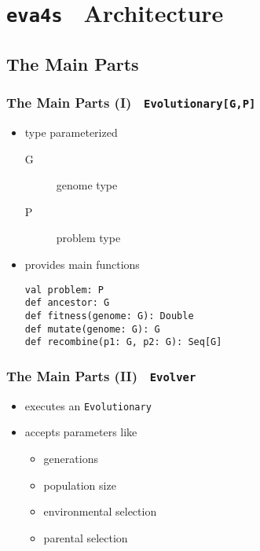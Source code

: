 \documentclass[compress,xcolor=table]{beamer}
\begin{document}
\section{\texttt{eva4s} \textendash\ Architecture}

\subsection{The Main Parts}

\begin{frame}
  \frametitle{The Main Parts (I) \textendash\ \texttt{Evolutionary[G,P]}}
  \begin{itemize}
    \item type parameterized
      \begin{description}
        \item[G] genome type
        \item[P] problem type
      \end{description}
    \item provides main functions
      \begin{description}
        \item[\texttt{val problem: P}]
        \item[\texttt{def ancestor: G}]
        \item[\texttt{def fitness(genome: G): Double}]
        \item[\texttt{def mutate(genome: G): G}]
        \item[\texttt{def recombine(p1: G, p2: G): Seq[G]}]
      \end{description}
  \end{itemize}
\end{frame}

\begin{frame}
  \frametitle{The Main Parts (II) \textendash\ \texttt{Evolver}}
  \begin{itemize}
    \item executes an \texttt{Evolutionary}
    \item accepts parameters like
    \begin{itemize}
      \item generations
      \item population size
      \item environmental selection
      \item parental selection
    \end{itemize}
  \end{itemize}
\end{frame}
\end{document}
